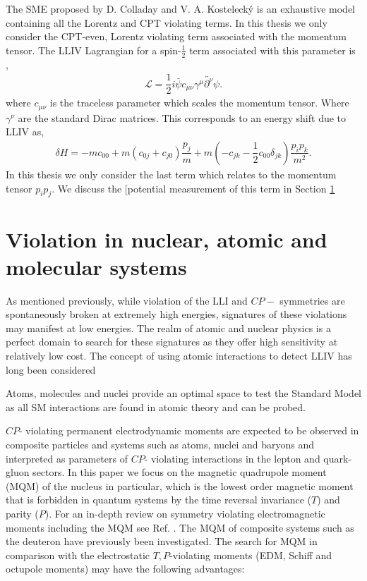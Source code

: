 \documentclass[10pt,a4paper, twoside, openright]{report}
\begin{document}
\linebreak
The SME proposed by D. Colladay and V. A. Kosteleck\'{y} is an exhaustive model containing all the Lorentz and CPT violating terms. In this thesis we only consider the CPT-even, Lorentz violating term associated with the momentum tensor. The LLIV Lagrangian for a spin-$\tfrac{1}{2}$ term associated with this parameter is \cite{Kostelecky1999},
\begin{align}
\mathcal{L} = \dfrac{1}{2}i\bar{\psi}c_{\mu\nu}\gamma^{\mu}\overleftrightarrow{\partial^{\nu}}\psi.
\end{align} 
where $c_{\mu\nu}$ is the traceless parameter which scales the momentum tensor. Where $\gamma^{\nu}$ are the standard Dirac matrices. This corresponds to an energy shift due to LLIV as,
\begin{align}
\delta H = -mc_{00} + m\left(c_{0j} + c_{j0}\right)\dfrac{p_j}{m} + m\left(-c_{jk} - \dfrac{1}{2}c_{00}\delta_{jk}\right)\dfrac{p_ip_k}{m^2}.
\end{align} 
In this thesis we only consider the last term which relates to the momentum tensor $p_ip_j$. We discuss the [potential measurement of this term in Section \ref{sec:ViolationInAtoms}



\section{Violation in nuclear, atomic and molecular systems} \label{sec:ViolationInAtoms}
As mentioned previously, while violation of the LLI and $CP-$ symmetries are spontaneously broken at extremely high energies, signatures of these violations may manifest at low energies. The realm of atomic and nuclear physics is a perfect domain to search for these signatures as they offer high sensitivity at relatively low cost. The concept of using atomic interactions to detect LLIV has long been considered \cite{Hughes1960, Drever1961, Prestage1985, Lamoreaux1986, Lamoreaux1989}


Atoms, molecules and nuclei provide an optimal space to test the Standard Model as all SM interactions are found in atomic theory and can be probed.


$CP$- violating permanent electrodynamic moments are expected to be observed in composite particles and systems  such as atoms, nuclei and baryons and interpreted as parameters of $CP$- violating interactions in the lepton and quark-gluon sectors. In this paper we focus on the magnetic quadrupole moment (MQM) of the nucleus in particular, which is the lowest order magnetic moment that is forbidden in quantum systems by the time reversal invariance ($T$) and  parity ($P$).  For an in-depth review on symmetry violating electromagnetic moments including the MQM see Ref. \cite{GF2004, KhriplovichPNC, SFK1984, Roberts2015, KhriplovichCP, Pospelov2005}. The MQM of composite systems such as the deuteron \cite{Liu2012} have previously been investigated. The search for MQM in comparison with the electrostatic $T,P$-violating moments (EDM, Schiff and octupole moments) may have the following advantages:
\end{document}
